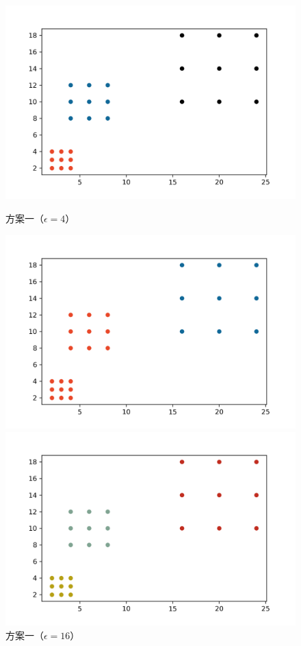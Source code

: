 \begin{figure}[htbp] %
	\begin{minipage}[t]{0.33\linewidth}
		\includegraphics[width=\linewidth]{img/dbhc-exp-1.png}
		\caption{方案一（$ \epsilon = 4 $）}
		\label{dbhcexp1}
	\end{minipage}%
	\hfill%
	\begin{minipage}[t]{0.33\linewidth}
		\includegraphics[width=\linewidth]{img/dbhc-exp-2.png}
		\caption{方案一（$ \epsilon = 16 $）}
		\label{dbhcexp2}
	\end{minipage}
	\hfill
	\begin{minipage}[t]{0.33\linewidth}
	\includegraphics[width=\linewidth]{img/dbhc-exp-3.png}

\end{minipage}
\end{figure}
